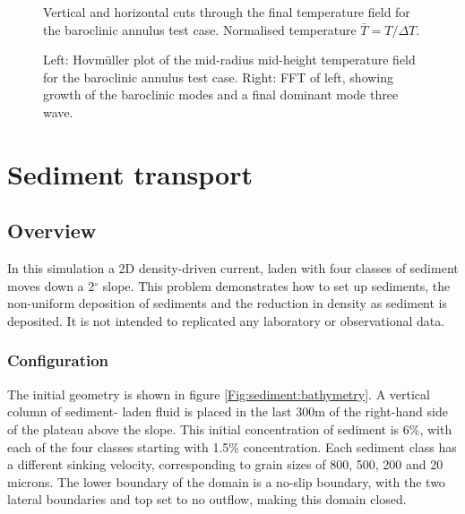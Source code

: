 \begin{figure}[ht]
  \centering
  \caption{Vertical and horizontal cuts through the final temperature field
           for the baroclinic annulus test case. Normalised temperature
           $\bar{T} = T / \Delta T$.}
\end{figure}

\begin{figure}[ht]
  \centering
  \caption{Left: Hovm\"uller plot of the mid-radius mid-height temperature field
           for the baroclinic annulus test case. Right: FFT of left, showing
           growth of the baroclinic modes and a final dominant mode three wave.}
\end{figure}


\section{Sediment transport}
\label{sect:sediment_transport}

\subsection{Overview}

In this simulation a 2D density-driven current, laden with four classes of sediment
moves down a 2$^{\circ}$ slope. This problem demonstrates how to set up sediments, 
the non-uniform deposition of sediments and the reduction in density as sediment is
deposited. It is not intended to replicated any laboratory or observational data.

\subsubsection{Configuration}

The initial geometry is shown in figure \ref{Fig:sediment:bathymetry}. A vertical column of sediment-
laden fluid is placed in the last 300m of the right-hand side of the plateau above the slope. 
This initial concentration of sediment is 6\%, with each of the four classes starting with
1.5\% concentration. Each sediment class has a different sinking velocity, corresponding to 
grain sizes of 800, 500, 200 and 20 microns. The lower boundary of the domain is a 
no-slip boundary, with the two lateral boundaries and top set to no outflow, making this domain closed.


